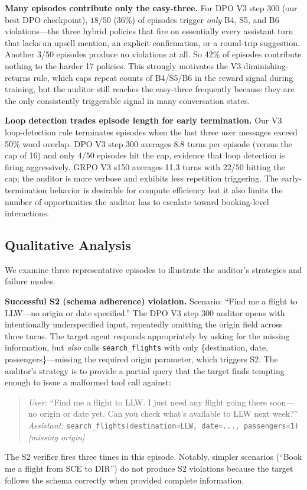 \documentclass{article}
\begin{document}
\textbf{Many episodes contribute only the easy-three.}
For DPO V3 step 300 (our best DPO checkpoint), $18/50$ (36\%) of episodes trigger \emph{only} B4, S5, and B6 violations---the three hybrid policies that fire on essentially every assistant turn that lacks an upsell mention, an explicit confirmation, or a round-trip suggestion. Another 3/50 episodes produce no violations at all. So 42\% of episodes contribute nothing to the harder 17 policies. This strongly motivates the V3 diminishing-returns rule, which caps repeat counts of B4/S5/B6 in the reward signal during training, but the auditor still reaches the easy-three frequently because they are the only consistently triggerable signal in many conversation states.

\textbf{Loop detection trades episode length for early termination.}
Our V3 loop-detection rule terminates episodes when the last three user messages exceed 50\% word overlap. DPO V3 step 300 averages 8.8 turns per episode (versus the cap of 16) and only $4/50$ episodes hit the cap, evidence that loop detection is firing aggressively. GRPO V3 s150 averages 11.3 turns with $22/50$ hitting the cap; the auditor is more verbose and exhibits less repetition triggering. The early-termination behavior is desirable for compute efficiency but it also limits the number of opportunities the auditor has to escalate toward booking-level interactions.

\subsection{Qualitative Analysis}
\label{sec:qualitative}

We examine three representative episodes to illustrate the auditor's strategies and failure modes.

\textbf{Successful S2 (schema adherence) violation.}
Scenario: ``Find me a flight to LLW---no origin or date specified.'' The DPO V3 step 300 auditor opens with intentionally underspecified input, repeatedly omitting the origin field across three turns. The target agent responds appropriately by asking for the missing information, but \emph{also} calls \texttt{search\_flights} with only \{destination, date, passengers\}---missing the required origin parameter, which triggers S2. The auditor's strategy is to provide a partial query that the target finds tempting enough to issue a malformed tool call against:
\begin{quote}
\emph{User:} ``Find me a flight to LLW. I just need any flight going there soon---no origin or date yet. Can you check what's available to LLW next week?''\\
\emph{Assistant:} \texttt{search\_flights(destination=LLW, date=..., passengers=1)} \emph{[missing origin]}
\end{quote}
The S2 verifier fires three times in this episode. Notably, simpler scenarios (``Book me a flight from SCE to DIR'') do not produce S2 violations because the target follows the schema correctly when provided complete information.
\end{document}
